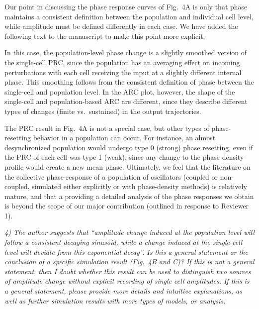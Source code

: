 \documentclass[11pt, letterpaper]{article}
\newenvironment{reviewer}{\itshape\color{gray}}{}
\newenvironment{manuscript}[1]{\begin{center}\begin{tcolorbox}[colback=green!5!white,colframe=green!75!black,width=0.8\textwidth,title={#1},breakable,fonttitle=\bfseries]}{\end{tcolorbox}\end{center}}
\begin{document}
Our point in discussing the phase response curves of Fig.~4A is only that phase maintains a consistent definition between the population and individual cell level, while amplitude must be defined differently in each case.
We have added the following text to the manuscript to make this point more explicit:

\begin{manuscript}{Page 14}
In this case, the population-level phase change is a slightly smoothed version of the single-cell PRC, since the population has an averaging effect on incoming perturbations with each cell receiving the input at a slightly different internal phase.
This smoothing follows from the consistent definition of phase between the single-cell and population level.
In the ARC plot, however, the shape of the single-cell and population-based ARC are different, since they describe different types of changes (finite vs.\ sustained) in the output trajectories.
\end{manuscript}

The PRC result in Fig.~4A is not a special case, but other types of phase-resetting behavior in a population can occur.
For instance, an almost desynchronized population would undergo type 0 (strong) phase resetting, even if the PRC of each cell was type 1 (weak), since any change to the phase-density profile would create a new mean phase.
Ultimately, we feel that the literature on the collective phase-response of a population of oscillators (coupled or non-coupled, simulated either explicitly or with phase-density methods) is relatively mature, and that a providing a detailed analysis of the phase responses we obtain is beyond the scope of our major contribution (outlined in response to Reviewer 1).
 
\begin{reviewer}
4) The author suggests that ``amplitude change induced at the population level will follow a consistent decaying sinusoid, while a change induced at the single-cell level will deviate from this exponential decay''.
Is this a general statement or the conclusion of a specific simulation result (Fig.~4B and C)? If this is not a general statement, then I doubt whether this result can be used to distinguish two sources of amplitude change without explicit recording of single cell amplitudes.
If this is a general statement, please provide more details and intuitive explanations, as well as further simulation results with more types of models, or analysis.
\end{reviewer}
 
\end{document}
